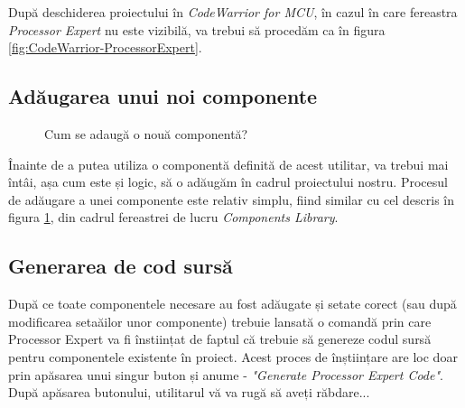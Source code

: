 După deschiderea proiectului în \textit{CodeWarrior for MCU}, în cazul în care fereastra \textit{Processor Expert} nu este vizibilă, va trebui să procedăm ca în figura \ref{fig:CodeWarrior-ProcessorExpert}.

\subsection{Adăugarea unui noi componente}

\begin{figure}
  \vspace{-20pt}
  \vspace{-15pt}
  \caption{\label{fig:CodeWarrior-ProcessorExpertAdd} Cum se adaugă o nouă componentă?}
  \vspace{-20pt}
\end{figure}

Înainte de a putea utiliza o componentă definită de acest utilitar, va trebui mai întâi, așa cum este și logic, să o adăugăm în cadrul proiectului nostru. Procesul de adăugare a unei componente este relativ simplu, fiind similar cu cel descris în figura \ref{fig:CodeWarrior-ProcessorExpertAdd}, din cadrul fereastrei de lucru \textit{Components Library}.

\subsection{Generarea de cod sursă}

După ce toate componentele necesare au fost adăugate și setate corect (sau după modificarea setaăilor unor componente) trebuie lansată o comandă prin care Processor Expert va fi înstiințat de faptul că trebuie să genereze codul sursă pentru componentele existente în proiect. Acest proces de înștiințare are loc doar prin apăsarea unui singur buton și anume - \textit{"Generate Processor Expert Code"}. După apăsarea butonului, utilitarul vă va rugă să aveți răbdare...

